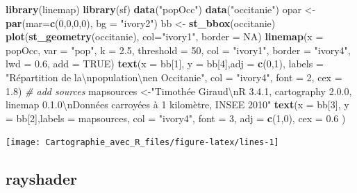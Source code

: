 \documentclass[]{book}
\newenvironment{Shaded}{\begin{snugshade}}{\end{snugshade}}
\newcommand{\CharTok}[1]{\textcolor[rgb]{0.31,0.60,0.02}{#1}}
\newcommand{\CommentTok}[1]{\textcolor[rgb]{0.56,0.35,0.01}{\textit{#1}}}
\newcommand{\DataTypeTok}[1]{\textcolor[rgb]{0.13,0.29,0.53}{#1}}
\newcommand{\DecValTok}[1]{\textcolor[rgb]{0.00,0.00,0.81}{#1}}
\newcommand{\FloatTok}[1]{\textcolor[rgb]{0.00,0.00,0.81}{#1}}
\newcommand{\KeywordTok}[1]{\textcolor[rgb]{0.13,0.29,0.53}{\textbf{#1}}}
\newcommand{\NormalTok}[1]{#1}
\newcommand{\OtherTok}[1]{\textcolor[rgb]{0.56,0.35,0.01}{#1}}
\newcommand{\StringTok}[1]{\textcolor[rgb]{0.31,0.60,0.02}{#1}}
\begin{document}
\begin{Shaded}
\begin{Highlighting}[]
\KeywordTok{library}\NormalTok{(linemap)}
\KeywordTok{library}\NormalTok{(sf)}
\KeywordTok{data}\NormalTok{(}\StringTok{"popOcc"}\NormalTok{)}
\KeywordTok{data}\NormalTok{(}\StringTok{"occitanie"}\NormalTok{)}
\NormalTok{opar <-}\StringTok{ }\KeywordTok{par}\NormalTok{(}\DataTypeTok{mar=}\KeywordTok{c}\NormalTok{(}\DecValTok{0}\NormalTok{,}\DecValTok{0}\NormalTok{,}\DecValTok{0}\NormalTok{,}\DecValTok{0}\NormalTok{), }\DataTypeTok{bg =} \StringTok{"ivory2"}\NormalTok{)}
\NormalTok{bb <-}\StringTok{ }\KeywordTok{st_bbox}\NormalTok{(occitanie)}
\KeywordTok{plot}\NormalTok{(}\KeywordTok{st_geometry}\NormalTok{(occitanie), }\DataTypeTok{col=}\StringTok{"ivory1"}\NormalTok{, }\DataTypeTok{border =} \OtherTok{NA}\NormalTok{)}
\KeywordTok{linemap}\NormalTok{(}\DataTypeTok{x =}\NormalTok{ popOcc, }\DataTypeTok{var =} \StringTok{"pop"}\NormalTok{, }\DataTypeTok{k =} \FloatTok{2.5}\NormalTok{, }\DataTypeTok{threshold =} \DecValTok{50}\NormalTok{,}
        \DataTypeTok{col =} \StringTok{"ivory1"}\NormalTok{, }\DataTypeTok{border =} \StringTok{"ivory4"}\NormalTok{, }\DataTypeTok{lwd =} \FloatTok{0.6}\NormalTok{, }\DataTypeTok{add =} \OtherTok{TRUE}\NormalTok{)}
\KeywordTok{text}\NormalTok{(}\DataTypeTok{x =}\NormalTok{ bb[}\DecValTok{1}\NormalTok{], }\DataTypeTok{y =}\NormalTok{ bb[}\DecValTok{4}\NormalTok{],}\DataTypeTok{adj =} \KeywordTok{c}\NormalTok{(}\DecValTok{0}\NormalTok{,}\DecValTok{1}\NormalTok{),}
     \DataTypeTok{labels =} \StringTok{"Répartition de la}\CharTok{\textbackslash{}n}\StringTok{population}\CharTok{\textbackslash{}n}\StringTok{en Occitanie"}\NormalTok{,  }
     \DataTypeTok{col =} \StringTok{"ivory4"}\NormalTok{, }\DataTypeTok{font =} \DecValTok{2}\NormalTok{,  }\DataTypeTok{cex =} \FloatTok{1.8}\NormalTok{)}
\CommentTok{# add sources}
\NormalTok{mapsources <-}\StringTok{"Timothée Giraud}\CharTok{\textbackslash{}n}\StringTok{R 3.4.1, cartography 2.0.0, linemap 0.1.0}\CharTok{\textbackslash{}n}\StringTok{Données carroyées à 1 kilomètre, INSEE 2010"}
\KeywordTok{text}\NormalTok{(}\DataTypeTok{x =}\NormalTok{ bb[}\DecValTok{3}\NormalTok{], }\DataTypeTok{y =}\NormalTok{ bb[}\DecValTok{2}\NormalTok{],}\DataTypeTok{labels =}\NormalTok{ mapsources,  }
     \DataTypeTok{col =} \StringTok{"ivory4"}\NormalTok{, }\DataTypeTok{font =} \DecValTok{3}\NormalTok{, }\DataTypeTok{adj =} \KeywordTok{c}\NormalTok{(}\DecValTok{1}\NormalTok{,}\DecValTok{0}\NormalTok{), }\DataTypeTok{cex =} \FloatTok{0.6}\NormalTok{ )}
\end{Highlighting}
\end{Shaded}

\begin{center}\texttt{[image: Cartographie\_avec\_R\_files/figure-latex/lines-1]} \end{center}

\hypertarget{rayshader}{%
\subsection{rayshader}\label{rayshader}}


\end{document}
